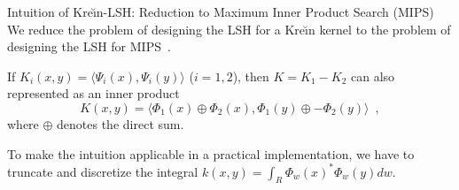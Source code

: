 \documentclass[final]{beamer}
\newcommand{\kr}{Kre\u{\i}n\xspace}
\DeclareMathOperator{\sech}{sech}
\newlength{\onecolwid}
\begin{document}
\begin{frame}[t]
\begin{columns}[t]
\begin{column}{\onecolwid}
\begin{block}{Intuition of \kr-LSH: Reduction to Maximum Inner Product Search (MIPS)}
 		We reduce the problem of designing the LSH for a \kr kernel to 
 		the problem of designing the LSH for MIPS~\citep{shrivastava2014asymmetric}.
 		
 		
 		 If 
 		$ K_i(x,y)=\langle 
 		\Psi_i(x),\Psi_i(y)\rangle $ ($i=1,2$),
 		then $ K = K_1-K_2 $ can also represented as an inner product 
 		\begin{equation}\label{eq:krein_inner_product}
 		K(x,y)=\langle \Phi_1(x)\oplus \Phi_2(x), \Phi_1(y)\oplus 
 		-\Phi_2(y)\rangle\enspace,
 		\end{equation}
 		where $ \oplus $ denotes the direct sum. 
 		
		To make the intuition 
		applicable in a 
		practical implementation, we have
		to truncate and discretize the 
		integral $ k(x,y) = \int_R \Phi_w(x)^* \Phi_w(y) 
		dw  $. 
		
        
		


\end{block}
\end{column}
\end{columns}
\end{frame}
\end{document}
